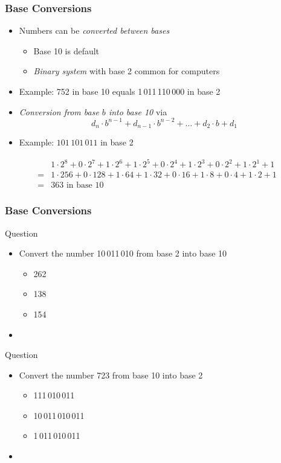 \documentclass[%
  final,
  11pt, 
  show notes, %
  t, %
  fleqn, %
]{beamer}
\begin{document}
\begin{frame}
  \frametitle{Base Conversions}
\begin{itemize}
\item Numbers can be \emph{converted between bases}
\begin{itemize} 
\item Base 10 is default
\item \emph{Binary system} with base 2 common for computers
\end{itemize}
\item Example: 752 in base 10 equals 1\,011\,110\,000 in base 2
\vspace*{0.3cm}
\item \emph{Conversion from base $b$ into base 10} via
\begin{equation*}
d_n \cdot b^{n-1} + d_{n-1} \cdot b^{n-2} + \ldots + d_2 \cdot b + d_1
\end{equation*}
\item Example: $101\,101\,011$ in base 2 
\end{itemize}
\begin{align*}
& 1 \cdot 2^8 + 0 \cdot 2^7 + 1 \cdot 2^6 + 1 \cdot 2^5 + 0 \cdot 2^4 + 1 \cdot 2^3 + 0 \cdot 2^2 + 1 \cdot 2^1 + 1 \\
= & 1 \cdot 256 + 0 \cdot 128 + 1 \cdot 64 + 1 \cdot 32 + 0 \cdot 16 + 1 \cdot 8 + 0 \cdot 4 + 1 \cdot 2 + 1 \\
= & 363 \text{ in base 10}
\end{align*}
\end{frame}

\begin{frame}
  \frametitle{Base Conversions}
\begin{exampleblock}{Question}
\begin{itemize}
\item Convert the number 10\,011\,010 from base 2 into base 10
\begin{itemize}
\item 262
\item 138
\item 154
\end{itemize}
\item \CourseQuiz
\end{itemize}
\end{exampleblock}
\pause
\vspace*{0.4cm}
\begin{exampleblock}{Question}
\begin{itemize}
\item Convert the number 723 from base 10 into base 2
\begin{itemize}
\item 111\,010\,011
\item 10\,011\,010\,011
\item 1\,011\,010\,011
\end{itemize}
\item \CourseQuiz
\end{itemize}
\end{exampleblock}
\end{frame}
\end{document}
